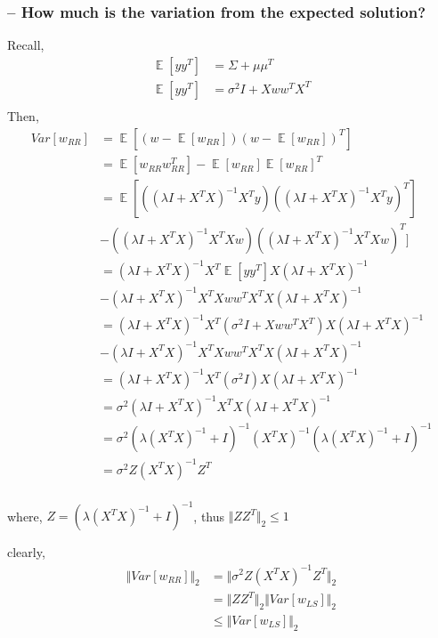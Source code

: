 \documentclass{article}
\DeclareMathOperator*{\E}{\mathop{\mathbb{E}}}
\begin{document}
\subsubsection{-- How much is the variation from the expected solution?}
Recall,
\begin{align*}
    \E[yy^T] &= \Sigma + \mu\mu^T\\
    \E[yy^T] &= \sigma^2I + Xww^TX^T\\
\end{align*}
Then,
\begin{align*}
    Var[w_{RR}] &= \E[(w-\E[w_{RR}])(w-\E[w_{RR}])^T]\\
    & = \E[w_{RR}w_{RR}^T]-\E[w_{RR}]\E[w_{RR}]^T\\
    & = \E[\left( (\lambda I + X^TX)^{-1} X^Ty \right) \left( (\lambda I + X^TX)^{-1} X^Ty \right)^T] \\
    & -\left( (\lambda I + X^TX)^{-1} X^TX w \right) \left( (\lambda I + X^TX)^{-1} X^TX w \right)^T]\\
    & = (\lambda I + X^TX)^{-1} X^T \E[yy^T] X (\lambda I + X^TX)^{-1} \\
    & - (\lambda I + X^TX)^{-1} X^TX ww^T X^T X (\lambda I + X^TX)^{-1}\\
    & = (\lambda I + X^TX)^{-1} X^T (\sigma^2I + Xww^TX^T) X (\lambda I + X^TX)^{-1} \\
    & - (\lambda I + X^TX)^{-1} X^TX ww^T X^T X (\lambda I + X^TX)^{-1}\\
    & = (\lambda I + X^TX)^{-1} X^T (\sigma^2I) X (\lambda I + X^TX)^{-1}\\
    & = \sigma^2 (\lambda I + X^TX)^{-1} X^T X (\lambda I + X^TX)^{-1}\\
    & = \sigma^2 (\lambda (X^TX)^{-1} + I)^{-1} (X^T X)^{-1} (\lambda (X^TX)^{-1} + I)^{-1}\\
    & = \sigma^2 Z (X^T X)^{-1} Z^T\\
\end{align*}

where, $Z = (\lambda (X^TX)^{-1} + I)^{-1}$, thus $\Vert ZZ^T \Vert_2 \leq 1$

clearly,
\begin{align*}
    \Vert Var[w_{RR}] \Vert_2 &= \Vert \sigma^2 Z (X^T X)^{-1} Z^T \Vert_2\\
    & = \Vert ZZ^T \Vert_2 \Vert Var[w_{LS}] \Vert_2\\
    & \leq \Vert Var[w_{LS}] \Vert_2\\
\end{align*}
\end{document}
